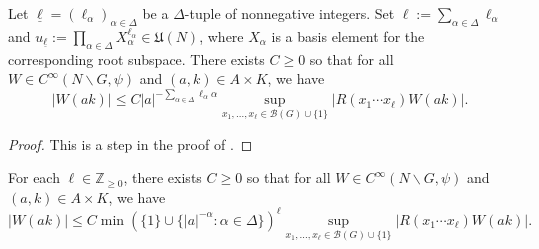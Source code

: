 \begin{lemma}\label{lem:sub-gln:let-underlinen-bzp}
  Let $\underline{\ell} = (\ell_\alpha)_{\alpha \in \Delta}$ be a $\Delta$-tuple of nonnegative integers.  Set $\ell := \sum_{\alpha \in \Delta} \ell_\alpha$ and $u_{\underline{\ell}} := \prod_{\alpha \in \Delta} X_\alpha^{\ell_\alpha} \in \mathfrak{U}(N)$, where $X_\alpha$ is a basis element for the corresponding root subspace.  There exists $C \geq 0$ so that for all $W \in C^\infty(N \backslash G, \psi)$ and $(a,k) \in A \times K$, we have
  \begin{equation*}
    |W(a k)| \leq
    C
    |a|^{-\sum_{\alpha \in \Delta} \ell_\alpha \alpha}
    \sup_{x_1,\dotsc,x_\ell \in \mathcal{B}(G) \cup \{1\}}
    |R(x_1 \dotsb x_\ell) W(a k)|.
  \end{equation*}
\end{lemma}
\begin{proof}
  This is a step in the proof of \cite[Lemma 2.5.1]{2018arXiv181200053B}.
\end{proof}
\begin{corollary}\label{cor:sub-gln:each-ell-in}
  For each $\ell \in \mathbb{Z}_{\geq 0}$, there exists $C \geq 0$ so that for all $W \in C^\infty(N \backslash G, \psi)$ and $(a,k) \in A \times K$, we have
  \begin{equation*}
    |W(a k)| \leq C
    \min (\{ 1 \} \cup \{ |a|^{-\alpha} : \alpha \in \Delta \})^{\ell}
    \sup_{x_1,\dotsc,x_\ell \in \mathcal{B}(G) \cup \{1\}}
    |R(x_1 \dotsb x_\ell) W(a k)|.
  \end{equation*}
\end{corollary}


